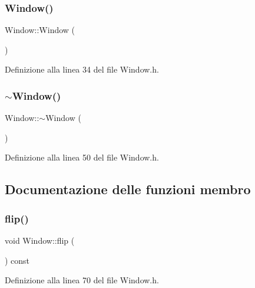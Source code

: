 \subsubsection{\texorpdfstring{Window()}{Window()}}
{\footnotesize\ttfamily Window\+::\+Window (\begin{DoxyParamCaption}{ }\end{DoxyParamCaption})\hspace{0.3cm}{\ttfamily [inline]}}



Definizione alla linea 34 del file Window.\+h.

\mbox{\label{class_window_a245d821e6016fa1f6970ccbbedd635f6}} 
\subsubsection{\texorpdfstring{$\sim$\+Window()}{~Window()}}
{\footnotesize\ttfamily Window\+::$\sim$\+Window (\begin{DoxyParamCaption}{ }\end{DoxyParamCaption})\hspace{0.3cm}{\ttfamily [inline]}}



Definizione alla linea 50 del file Window.\+h.



\subsection{Documentazione delle funzioni membro}
\mbox{\label{class_window_af631f002af0ab2ff38e0bdab9560ce3a}} 
\subsubsection{\texorpdfstring{flip()}{flip()}}
{\footnotesize\ttfamily void Window\+::flip (\begin{DoxyParamCaption}{ }\end{DoxyParamCaption}) const\hspace{0.3cm}{\ttfamily [inline]}}



Definizione alla linea 70 del file Window.\+h.

\mbox{\label{class_window_a5a7cca2048dcd75c1f9b6ca594cccad0}} 
